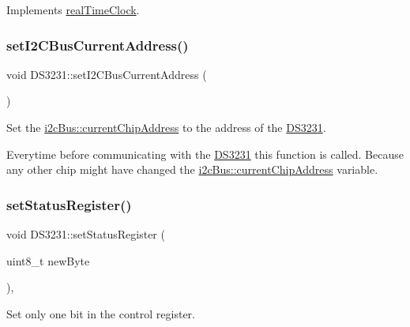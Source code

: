 Implements \mbox{\hyperlink{classreal_time_clock_a4d6e8056f52cea52bab5c635c0860c12}{real\+Time\+Clock}}.

\mbox{\label{class_d_s3231_ae6ef1547a0d2c2653ae3fe4c0f6a62ff}} 
\subsubsection{\texorpdfstring{set\+I2\+C\+Bus\+Current\+Address()}{setI2CBusCurrentAddress()}}
{\footnotesize\ttfamily void D\+S3231\+::set\+I2\+C\+Bus\+Current\+Address (\begin{DoxyParamCaption}{ }\end{DoxyParamCaption})\hspace{0.3cm}{\ttfamily [private]}}



Set the \mbox{\hyperlink{classi2c_bus_a64ff87527c88619d72ede947d73eac3a}{i2c\+Bus\+::current\+Chip\+Address}} to the address of the \mbox{\hyperlink{class_d_s3231}{D\+S3231}}. 

Everytime before communicating with the \mbox{\hyperlink{class_d_s3231}{D\+S3231}} this function is called. Because any other chip might have changed the \mbox{\hyperlink{classi2c_bus_a64ff87527c88619d72ede947d73eac3a}{i2c\+Bus\+::current\+Chip\+Address}} variable. \mbox{\label{class_d_s3231_a303a9a5123f66987e209396d60e329e8}} 
\subsubsection{\texorpdfstring{set\+Status\+Register()}{setStatusRegister()}}
{\footnotesize\ttfamily void D\+S3231\+::set\+Status\+Register (\begin{DoxyParamCaption}\item[{uint8\+\_\+t}]{new\+Byte }\end{DoxyParamCaption})\hspace{0.3cm}{\ttfamily [override]}, {\ttfamily [virtual]}}



Set only one bit in the control register. 


